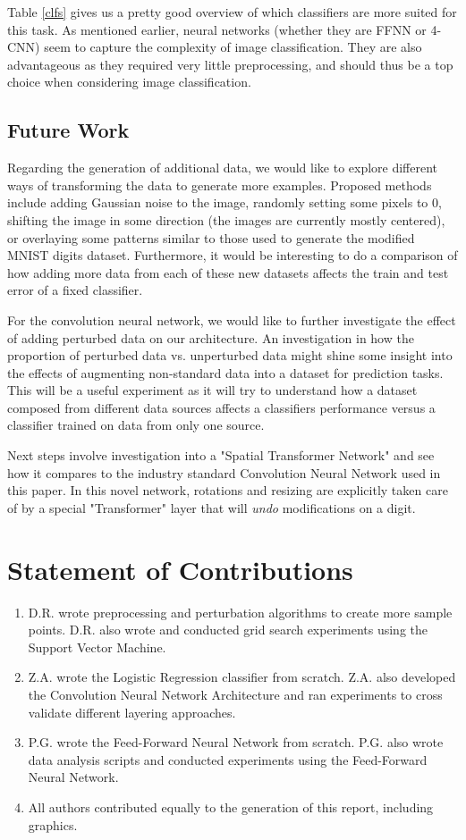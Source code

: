 \documentclass[conference]{IEEEtran}
\begin{document}
Table \ref{clfs} gives us a pretty good overview of which classifiers are more suited for this task. As mentioned earlier, neural networks (whether they are FFNN or 4-CNN) seem to capture the complexity of image classification. They are also advantageous as they required very little preprocessing, and should thus be a top choice when considering image classification.


\subsection{Future Work}

Regarding the generation of additional data, we would like to explore different ways of transforming the data to generate more examples. Proposed methods include adding Gaussian noise to the image, randomly setting some pixels to 0, shifting the image in some direction (the images are currently mostly centered), or overlaying some patterns similar to those used to generate the modified MNIST digits dataset. Furthermore, it would be interesting to do a comparison of how adding more data from each of these new datasets affects the train and test error of a fixed classifier. 

For the convolution neural network, we would like to further investigate the effect of adding perturbed data on our architecture. An investigation in how the proportion of perturbed data vs. unperturbed data might shine some insight into the effects of augmenting non-standard data into a dataset for prediction tasks. This will be a useful experiment as it will try to understand how a dataset composed from different data sources affects a classifiers performance versus a classifier trained on data from only one source.

Next steps involve investigation into a "Spatial Transformer Network" \cite{STN} and see how it compares to the industry standard Convolution Neural Network used in this paper. In this novel network, rotations and resizing are explicitly taken care of by a special "Transformer" layer that will \emph{undo} modifications on a digit. 


\section{Statement of Contributions}

\begin{enumerate}
\item D.R. wrote preprocessing and perturbation algorithms to create more sample points. D.R. also wrote and conducted grid search experiments using the Support Vector Machine.
\item Z.A. wrote the Logistic Regression classifier from scratch. Z.A. also developed the Convolution Neural Network Architecture and ran experiments to cross validate different layering approaches.
\item P.G. wrote the Feed-Forward Neural Network from scratch. P.G. also wrote data analysis scripts and conducted experiments using the Feed-Forward Neural Network.
\item All authors contributed equally to the generation of this report, including graphics.
\end{enumerate}
\end{document}
